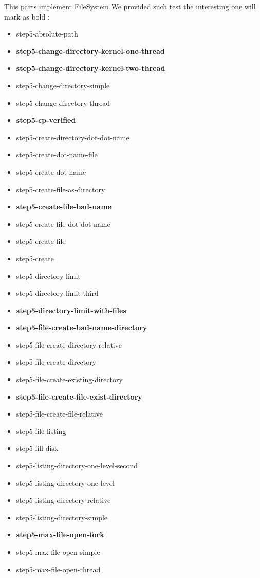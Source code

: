 \documentclass[a4paper,10pt]{article}
\begin{document}
This parts implement FileSystem We provided such test the interesting one will mark as bold :
\begin{itemize}
\item step5-absolute-path
\item {\bf step5-change-directory-kernel-one-thread}
\item {\bf step5-change-directory-kernel-two-thread}
\item step5-change-directory-simple
\item step5-change-directory-thread
\item {\bf step5-cp-verified}
\item step5-create-directory-dot-dot-name
\item step5-create-dot-name-file
\item step5-create-dot-name
\item step5-create-file-as-directory
\item {\bf step5-create-file-bad-name}
\item step5-create-file-dot-dot-name
\item step5-create-file
\item step5-create
\item step5-directory-limit
\item step5-directory-limit-third
\item {\bf step5-directory-limit-with-files}
\item {\bf step5-file-create-bad-name-directory}
\item step5-file-create-directory-relative
\item step5-file-create-directory
\item step5-file-create-existing-directory
\item {\bf step5-file-create-file-exist-directory}
\item step5-file-create-file-relative
\item step5-file-listing
\item step5-fill-disk
\item step5-listing-directory-one-level-second
\item step5-listing-directory-one-level
\item step5-listing-directory-relative
\item step5-listing-directory-simple
\item {\bf step5-max-file-open-fork}
\item step5-max-file-open-simple
\item step5-max-file-open-thread

\end{itemize}
\end{document}
